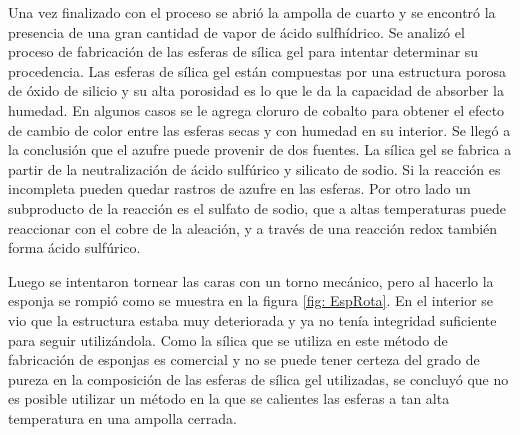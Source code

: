 \documentclass[a4paper,12pt,fleqn,twoside,openany]{book}
\begin{document}
Una vez finalizado con el proceso se abrió la ampolla de cuarto y se encontró la presencia de una gran cantidad de vapor de ácido sulfhídrico. Se analizó el proceso de fabricación de las esferas de sílica gel para intentar determinar su procedencia. Las esferas de sílica gel están compuestas por una estructura porosa de óxido de silicio y su alta porosidad es lo que le da la capacidad de absorber la humedad. En algunos casos se le agrega cloruro de cobalto para obtener el efecto de cambio de color entre las esferas secas y con humedad en su interior. Se llegó a la conclusión que el azufre puede provenir de dos fuentes. La sílica gel se fabrica a partir de la neutralización de ácido sulfúrico y silicato de sodio. Si la reacción es incompleta pueden quedar rastros de azufre en las esferas. Por otro lado un subproducto de la reacción es el sulfato de sodio, que a altas temperaturas puede reaccionar con el cobre de la aleación, y a través de una reacción redox también  forma ácido sulfúrico. 

Luego se intentaron tornear las caras con un torno mecánico, pero al hacerlo la esponja se rompió como se muestra en la figura \ref{fig: EspRota}. En el interior se vio que la estructura estaba muy deteriorada y ya no tenía integridad suficiente para seguir utilizándola. Como la sílica que se utiliza en este método de fabricación de esponjas es comercial y no se puede tener certeza del grado de pureza en la composición de las esferas de sílica gel utilizadas, se concluyó que no es posible utilizar un método en la que se calientes las esferas a tan alta temperatura en una ampolla cerrada. 




% 
\end{document}
